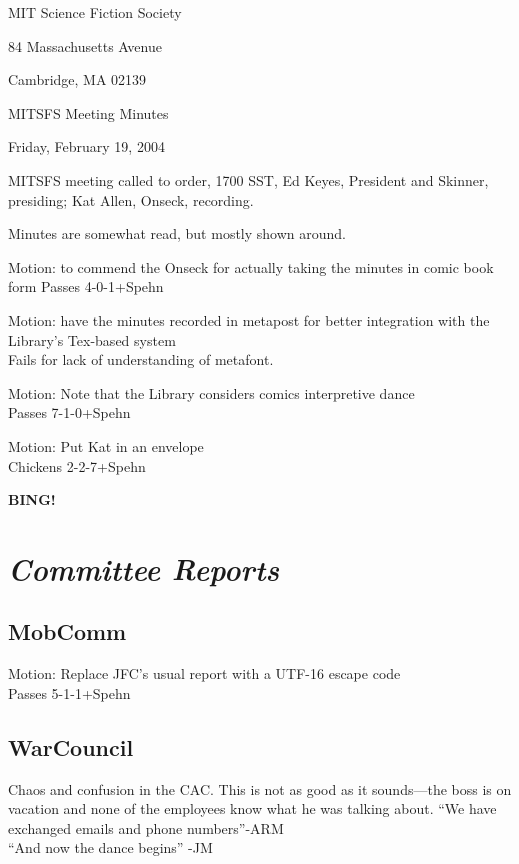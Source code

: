 \documentclass[10pt]{article}
\newcommand{\bing}{{\bf BING!} }
\newcommand{\goto}[1]{\bing \vskip 12pt \section*{{\em{#1}}}}
\begin{document}
\begin{center}

MIT Science Fiction Society 

84 Massachusetts Avenue

Cambridge, MA 02139

\vspace{12pt}

MITSFS Meeting Minutes 

Friday, February 19, 2004

\end{center}
 
\vspace{18pt}

\setlength{\parskip}{6pt}

\noindent
MITSFS meeting called to order, 1700 SST, Ed Keyes, President and
Skinner, presiding; Kat Allen,  Onseck, recording.

Minutes are somewhat read, but mostly shown around.

Motion: to commend the Onseck for actually taking the minutes in comic
book form
Passes 4-0-1+Spehn

Motion: have the minutes recorded in metapost for better integration
with the Library's Tex-based system\\
Fails for lack of understanding of metafont.

Motion: Note that the Library considers comics interpretive dance\\
Passes 7-1-0+Spehn

Motion: Put Kat in an envelope\\
Chickens 2-2-7+Spehn

\goto{Committee Reports}
\subsection*{MobComm}
Motion: Replace JFC's usual report with a UTF-16 escape code\\
Passes 5-1-1+Spehn

\subsection*{WarCouncil}
Chaos and confusion in the CAC. This is not as good as it sounds---the
boss is on vacation and none of the employees know what he was talking about.
``We have exchanged emails and phone numbers''-ARM\\
``And now the dance begins'' -JM\\
\end{document}
